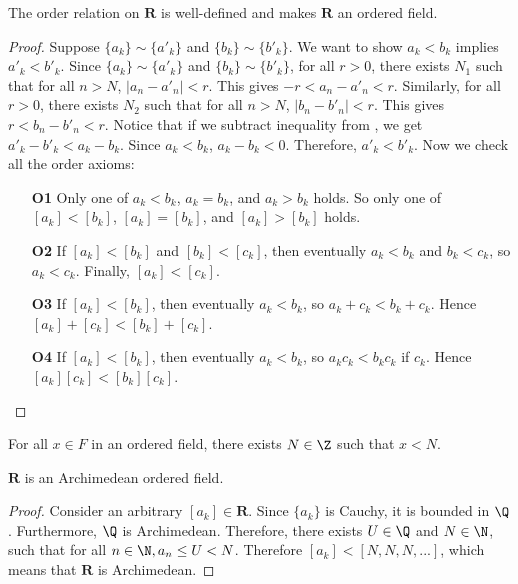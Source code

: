 \documentclass[10pt]{article}
\begin{document}
\begin{proposition}
    The order relation on $\textbf{R}$ is well-defined and makes $\textbf{R}$ an ordered field.
\end{proposition}
\begin{proof}
    Suppose $\{a_k\}\sim \{a'_k\}$ and $\{b_k\}\sim \{b'_k\}$. We want to show $a_k<b_k$ implies $a'_k<b'_k$. Since $\{a_k\}\sim \{a'_k\}$ and $\{b_k\}\sim \{b'_k\}$, for all $r>0$, there exists $N_1$ such that for all $n>N$, $|a_n-a'_n|<r$. This gives  $-r<a_n-a'_n<r$. Similarly, for all $r>0$, there exists $N_2$ such that for all $n>N$, $|b_n-b'_n|<r$. This gives  $r<b_n-b'_n<r$.
    Notice that if we subtract inequality  from , we get $a'_k-b'_k<a_k-b_k$. Since $a_k<b_k$, $a_k-b_k<0$. Therefore, $a'_k<b'_k$. Now we check all the order axioms:
    \begin{enumerate}
        \item[\textbf{O1}] Only one of $a_k < b_k$, $a_k = b_k$, and $a_k > b_k$ holds. So only one of $[a_k] < [b_k]$, $[a_k] = [b_k]$, and $[a_k] > [b_k]$ holds.
        \item[\textbf{O2}] If $[a_k] < [b_k]$ and $[b_k] < [c_k]$, then eventually $a_k < b_k$ and $b_k < c_k$, so $a_k < c_k$. Finally, $[a_k] < [c_k]$.
        \item[\textbf{O3}] If $[a_k] < [b_k]$, then eventually $a_k < b_k$, so $a_k + c_k < b_k + c_k$. Hence $[a_k] + [c_k] < [b_k] + [c_k]$.
        \item[\textbf{O4}] If $[a_k] < [b_k]$, then eventually $a_k < b_k$, so $a_kc_k < b_kc_k$ if $c_k$. Hence $[a_k][c_k] < [b_k][c_k]$.
    \end{enumerate}
\end{proof}
\begin{definition}[Archimedean]
    For all $x \in F$ in an ordered field, there exists $ N \in \Z$ such that $x < N$.
\end{definition}
\begin{proposition}
    $\textbf{R}$ is an Archimedean ordered field.
\end{proposition}
\begin{proof}
    Consider an arbitrary $[a_k]\in \mathbf{R}$. Since $\{a_k\}$ is Cauchy, it is bounded in $\Q$. Furthermore, $\Q$ is Archimedean. Therefore, there exists $U\in\Q$ and $N\in\N$, such that for all $n\in\N, a_n\leq U<N$. Therefore $[a_k]<[N,N,N,...]$, which means that $\mathbf{R}$ is Archimedean.
\end{proof}
    
\end{document}

